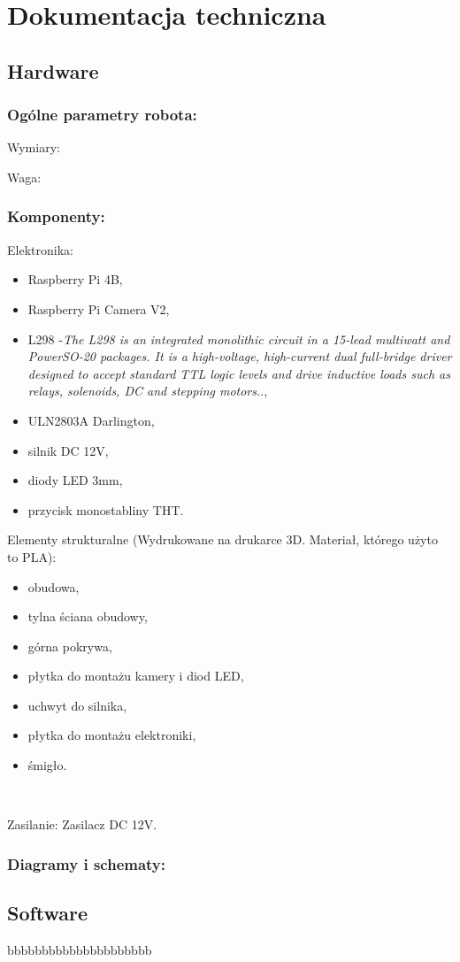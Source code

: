 \section{Dokumentacja techniczna}
\subsection{Hardware}
\subsubsection{Ogólne parametry robota:}
Wymiary: 

Waga:

\subsubsection{Komponenty:}
Elektronika:
    \begin{itemize}
        \item Raspberry Pi 4B,
        \item Raspberry Pi Camera V2,
        \item L298 -\textit{The L298 is an integrated monolithic circuit in a 15-lead multiwatt and PowerSO-20
        packages. It is a high-voltage, high-current dual full-bridge driver designed to accept
        standard TTL logic levels and drive inductive loads such as relays, solenoids, DC
        and stepping motors.}.\cite{L298},
        \item ULN2803A Darlington,
        \item silnik DC 12V,
        \item diody LED 3mm,
        \item przycisk monostabliny THT.
    \end{itemize}

Elementy strukturalne (Wydrukowane na drukarce 3D. Materiał, którego użyto to PLA):
    \begin{itemize}
        \item obudowa,
        \item tylna ściana obudowy,
        \item górna pokrywa,
        \item płytka do montażu kamery i diod LED,
        \item uchwyt do silnika,
        \item płytka do montażu elektroniki,
        \item śmigło.
    \end{itemize}\

Zasilanie:
Zasilacz DC 12V.

\subsubsection{Diagramy i schematy:}








\subsection{Software}
bbbbbbbbbbbbbbbbbbbbb